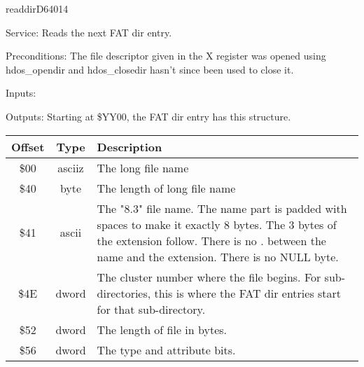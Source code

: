 \newpage
\begin{hyppotrap}{readdir}{D640}{14}
\item [Service:]
  Reads the next FAT dir entry.
\item [Preconditions:]
  The file descriptor given in the X register was opened using hdos\_opendir
  and hdos\_closedir hasn't since been used to close it.
\item [Inputs:]
\item [Outputs:]
  Starting at \$YY00, the FAT dir entry has this structure.
  {\setlength{\tabcolsep}{2mm}
  \begin{tabular}{|c|c|p{6.9cm}|}
  \hline
  \textbf{Offset} & \textbf{Type} & \textbf{Description}
  \\\hline
  \$00 & asciiz & The long file name
  \\
  \$40 & byte & The length of long file name
  \\
  \$41 & ascii & The "8.3" file name. The name part is padded with spaces to make
               it exactly 8 bytes. The 3 bytes of the extension follow. There is
               no . between the name and the extension. There is no NULL byte.
  \\
  \$4E & dword & The cluster number where the file begins. For sub-directories,
               this is where the FAT dir entries start for that sub-directory.
  \\
  \$52 & dword & The length of file in bytes.
  \\
  \$56 & dword & The type and attribute bits.
  \\\hline
  \end{tabular}
  }


\end{hyppotrap}

